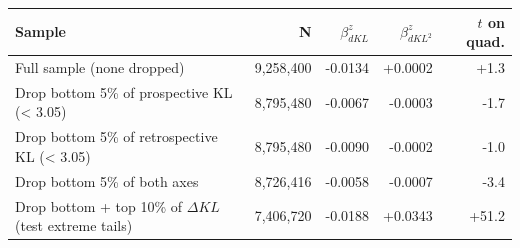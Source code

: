 \begin{tabular}{lrrrr}
\toprule
Sample & N & $\beta_{dKL}^z$ & $\beta_{dKL^2}^z$ & $t$ on quad. \\
\midrule
Full sample (none dropped) & 9,258,400 & -0.0134 & +0.0002 & +1.3 \\
Drop bottom 5\% of prospective KL (< 3.05) & 8,795,480 & -0.0067 & -0.0003 & -1.7 \\
Drop bottom 5\% of retrospective KL (< 3.05) & 8,795,480 & -0.0090 & -0.0002 & -1.0 \\
Drop bottom 5\% of both axes & 8,726,416 & -0.0058 & -0.0007 & -3.4 \\
Drop bottom + top 10\% of $\Delta KL$ (test extreme tails) & 7,406,720 & -0.0188 & +0.0343 & +51.2 \\
\bottomrule
\end{tabular}

